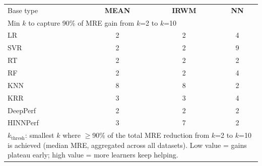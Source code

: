 \begin{tabular}{lccc}
\toprule
Base type & \textbf{MEAN} & \textbf{IRWM} & \textbf{NN} \\
\multicolumn{4}{l}{\footnotesize Min $k$ to capture 90\% of MRE gain from $k$=2 to $k$=10} \\
\midrule
LR & 2 & 2 & 4 \\
SVR & 2 & 2 & 9 \\
RT & 2 & 2 & 2 \\
RF & 2 & 2 & 4 \\
KNN & 8 & 8 & 2 \\
KRR & 3 & 3 & 4 \\
DeepPerf & 2 & 2 & 2 \\
HINNPerf & 3 & 7 & 2 \\
\bottomrule
\multicolumn{4}{l}{\footnotesize $k_{\text{thresh}}$: smallest $k$ where $\geq$90\% of the total MRE reduction from $k$=2 to $k$=10 is achieved (median MRE, aggregated across all datasets). Low value = gains plateau early; high value = more learners keep helping.} \\
\end{tabular}
